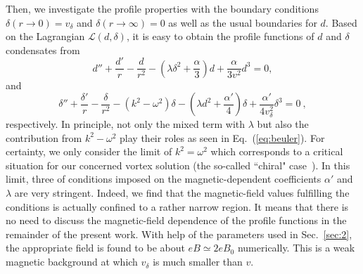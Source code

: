 \documentclass[12pt]{article}
\begin{document}
Then, we investigate the profile properties with the boundary conditions $\delta(r \rightarrow 0) = v_\delta$ and $\delta(r \rightarrow \infty) = 0$ as well as the usual boundaries for $d$. 
Based on the Lagrangian $\mathcal{L}(d,\delta)$, it is easy to obtain the profile functions of $d$ and $\delta$ condensates from
\begin{equation}
  \label{eq:deuler}
  d'' +\frac{d'}{r} - \frac{d}{r^2} - (\lambda \delta^2 + \frac{\alpha}{3})d + \frac{\alpha}{3v^2}d^3 = 0,
\end{equation}
and
\begin{equation}
  \label{eq:beuler}
  \delta'' +\frac{\delta'}{r} - \frac{\delta}{r^2} - (k^2 - \omega^2)\delta - (\lambda d^2 + \frac{\alpha'}{4})\delta + \frac{\alpha'}{4v_\delta^2}\delta^3 = 0 \ ,
\end{equation}
respectively. In principle, not only the mixed term with $\lambda$ but also the contribution from $k^2-\omega^2$ play their roles as seen in Eq.~(\ref{eq:beuler}). For certainty, we only consider the limit of $k^2=\omega^2$ which corresponds to a
critical situation for our concerned vortex solution (the so-called ``chiral" case~\cite{lemperiere2003behaviour}).
In this limit, three of conditions imposed on the magnetic-dependent coefficients $\alpha'$ and $\lambda$ are very stringent. 
Indeed, we find that the magnetic-field values fulfilling the conditions is actually confined to a
rather narrow region. 
It means that there is no need to discuss the magnetic-field dependence of the profile functions in the remainder of the present work. 
With help of the parameters
used in Sec.~\ref{sec:2}, the appropriate field is found to be about $eB \simeq 2 eB_0$ numerically. This is a weak magnetic background at which $v_\delta$ is much smaller than $v$.
\end{document}
